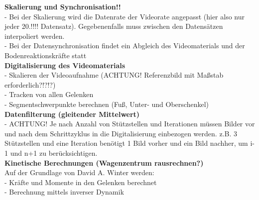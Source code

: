 \textbf{Skalierung und Synchronisation!!}\\
- Bei der Skalierung wird die Datenrate der Videorate angepasst (hier also nur jeder 20.!!!! Datensatz). Gegebenenfalls muss zwischen den Datensätzen interpoliert werden.\\
- Bei der Datensynchronisation findet ein Abgleich des Videomaterials und der Bodenreaktionskräfte statt\\
\textbf{Digitalisierung des Videomaterials}\\
- Skalieren der Videoaufnahme (ACHTUNG! Referenzbild mit Maßstab erforderlich?!?!?)\\
- Tracken von allen Gelenken\\
- Segmentschwerpunkte berechnen (Fuß, Unter- und Oberschenkel)\\
\textbf{Datenfilterung (gleitender Mittelwert)}\\
- ACHTUNG! Je nach Anzahl von Stützstellen und Iterationen müssen Bilder vor und nach dem Schrittzyklus in die Digitalisierung einbezogen werden. z.B. 3 Stützstellen und eine Iteration benötigt 1 Bild vorher und ein Bild nachher, um i-1 und n+1 zu berücksichtigen.\\
\textbf{Kinetische Berechnungen (Wagenzentrum rausrechnen?)}\\
Auf der Grundlage von David A. Winter werden:\\
- Kräfte und Momente in den Gelenken berechnet\\
- Berechnung mittels inverser Dynamik\\
